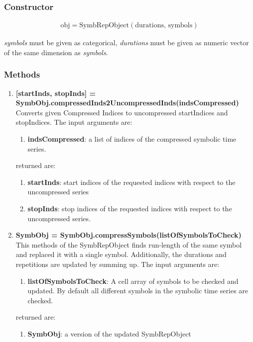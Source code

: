 \documentclass[a4]{scrreprt}
\begin{document}
\subsubsection{Constructor}

\begin{align*}
\text{obj} = \text{SymbRepObject}(\text{durations, }\text{symbols})
\end{align*}

\textit{symbols} must be given as categorical, \textit{durations} must be given as numeric vector of the same dimension as \textit{symbols}.

\subsubsection{Methods}

\begin{enumerate}
	\item \textbf{[startInds, stopInds] = SymbObj.compressedInds2UncompressedInds(indsCompressed)}\\
		Converts given Compressed Indices to uncompressed startIndices and stopIndices. 
		The input arguments are:
		\begin{enumerate}
			\item \textbf{indsCompressed}: a list of indices of the compressed symbolic time series.
		\end{enumerate}
		returned are:
		\begin{enumerate}
			\item \textbf{startInds}: start indices of the requested indices with respect to the  uncompressed series
			\item \textbf{stopInds}: stop indices of the requested indices with respect to the uncompressed series.
		\end{enumerate}
	
	\item \textbf{SymbObj = SymbObj.compressSymbols(listOfSymbolsToCheck)}\\
		This methods of the SymbRepObject finds run-length of the same symbol and replaced it with a single symbol. Additionally, the durations and repetitions are updated by summing up.
		The input arguments are:
		\begin{enumerate}
			\item \textbf{listOfSymbolsToCheck}: A cell array of symbols to be checked and updated. By default all different symbols in the symbolic time series are checked.
		\end{enumerate}
		returned are:
		\begin{enumerate}
			\item \textbf{SymbObj}: a version of the updated SymbRepObject
		\end{enumerate}
	

\end{enumerate}
\end{document}
